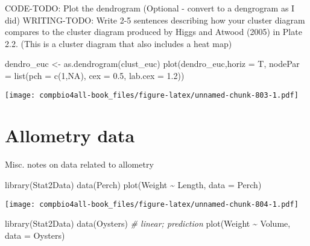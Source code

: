 \documentclass[
]{book}
\newenvironment{Shaded}{\begin{snugshade}}{\end{snugshade}}
\newcommand{\AttributeTok}[1]{\textcolor[rgb]{0.77,0.63,0.00}{#1}}
\newcommand{\CommentTok}[1]{\textcolor[rgb]{0.56,0.35,0.01}{\textit{#1}}}
\newcommand{\ConstantTok}[1]{\textcolor[rgb]{0.00,0.00,0.00}{#1}}
\newcommand{\DecValTok}[1]{\textcolor[rgb]{0.00,0.00,0.81}{#1}}
\newcommand{\FloatTok}[1]{\textcolor[rgb]{0.00,0.00,0.81}{#1}}
\newcommand{\FunctionTok}[1]{\textcolor[rgb]{0.00,0.00,0.00}{#1}}
\newcommand{\NormalTok}[1]{#1}
\newcommand{\OtherTok}[1]{\textcolor[rgb]{0.56,0.35,0.01}{#1}}
\newcommand{\SpecialCharTok}[1]{\textcolor[rgb]{0.00,0.00,0.00}{#1}}
\begin{document}
CODE-TODO: Plot the dendrogram
(Optional - convert to a dengrogram as I did)
WRITING-TODO: Write 2-5 sentences describing how your cluster diagram compares to the cluster diagram produced by Higgs and Atwood (2005) in Plate 2.2. (This is a cluster diagram that also includes a heat map)

\begin{Shaded}
\begin{Highlighting}[]
\NormalTok{dendro\_euc }\OtherTok{\textless{}{-}} \FunctionTok{as.dendrogram}\NormalTok{(clust\_euc)}
\FunctionTok{plot}\NormalTok{(dendro\_euc,}\AttributeTok{horiz =}\NormalTok{ T,}
     \AttributeTok{nodePar =} \FunctionTok{list}\NormalTok{(}\AttributeTok{pch =} \FunctionTok{c}\NormalTok{(}\DecValTok{1}\NormalTok{,}\ConstantTok{NA}\NormalTok{), }
                  \AttributeTok{cex =} \FloatTok{0.5}\NormalTok{, }
                   \AttributeTok{lab.cex =} \FloatTok{1.2}\NormalTok{))}
\end{Highlighting}
\end{Shaded}

\texttt{[image: compbio4all-book\_files/figure-latex/unnamed-chunk-803-1.pdf]}

\hypertarget{allometry-data}{%
\chapter{Allometry data}\label{allometry-data}}

Misc. notes on data related to allometry

\begin{Shaded}
\begin{Highlighting}[]
\FunctionTok{library}\NormalTok{(Stat2Data)}
\FunctionTok{data}\NormalTok{(Perch)}
\FunctionTok{plot}\NormalTok{(Weight }\SpecialCharTok{\textasciitilde{}}\NormalTok{ Length, }\AttributeTok{data =}\NormalTok{ Perch)}
\end{Highlighting}
\end{Shaded}

\texttt{[image: compbio4all-book\_files/figure-latex/unnamed-chunk-804-1.pdf]}

\begin{Shaded}
\begin{Highlighting}[]
\FunctionTok{library}\NormalTok{(Stat2Data)}
\FunctionTok{data}\NormalTok{(Oysters)  }\CommentTok{\# linear; prediction}
\FunctionTok{plot}\NormalTok{(Weight }\SpecialCharTok{\textasciitilde{}}\NormalTok{ Volume, }\AttributeTok{data =}\NormalTok{ Oysters)}
\end{Highlighting}
\end{Shaded}
\end{document}
